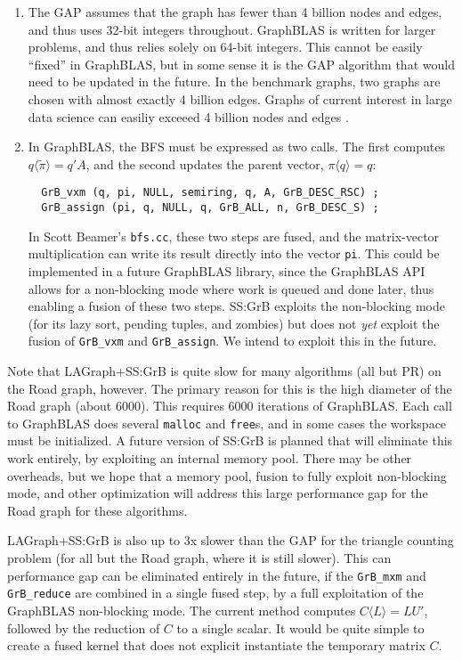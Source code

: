\begin{enumerate}
\item
The GAP assumes that the graph has fewer than 4 billion nodes and edges, and
thus uses 32-bit integers throughout.  GraphBLAS is written for larger
problems, and thus relies solely on 64-bit integers.  This cannot be easily
``fixed'' in GraphBLAS, but in some sense it is the GAP algorithm that would
need to be updated in the future.  In the benchmark graphs, two graphs are
chosen with almost exactly 4 billion edges.  Graphs of current interest in
large data science can easiliy exceeed 4 billion nodes and edges
\cite{9286235}.

\item In GraphBLAS, the BFS must be expressed as two calls.  The first computes
$q \langle \tilde \pi \rangle = q'A$, and the second updates the parent vector,
$ \pi \langle q \rangle = q$:

{\footnotesize
\begin{verbatim}
  GrB_vxm (q, pi, NULL, semiring, q, A, GrB_DESC_RSC) ;
  GrB_assign (pi, q, NULL, q, GrB_ALL, n, GrB_DESC_S) ; \end{verbatim}}

In Scott Beamer's \verb'bfs.cc', these two steps are fused, and the
matrix-vector multiplication can write its result directly into the vector
\verb'pi'.  This could be implemented in a future GraphBLAS library, since the
GraphBLAS API allows for a non-blocking mode where work is queued and done
later, thus enabling a fusion of these two steps.  SS:GrB exploits the
non-blocking mode (for its lazy sort, pending tuples, and zombies) but does not
{\em yet} exploit the fusion of \verb'GrB_vxm' and \verb'GrB_assign'.  We
intend to exploit this in the future.
\end{enumerate}

Note that LAGraph+SS:GrB is quite slow for many algorithms (all but PR) on the
Road graph, however.  The primary reason for this is the high diameter of the
Road graph (about 6000).  This requires 6000 iterations of GraphBLAS.  Each
call to GraphBLAS does several \verb'malloc' and \verb'free's, and in some
cases the workspace must be initialized.  A future version of SS:GrB is planned
that will eliminate this work entirely, by exploiting an internal memory pool.
There may be other overheads, but we hope that a memory pool, fusion to fully
exploit non-blocking mode, and other optimization will address this large
performance gap for the Road graph for these algorithms.

LAGraph+SS:GrB is also up to 3x slower than the GAP for the triangle counting
problem (for all but the Road graph, where it is still slower).  This can
performance gap can be eliminated entirely in the future, if the \verb'GrB_mxm'
and \verb'GrB_reduce' are combined in a single fused step, by a full
exploitation of the GraphBLAS non-blocking mode.  The current method computes
$C \langle L \rangle = LU'$, followed by the reduction of $C$ to a single
scalar.  It would be quite simple to create a fused kernel that does not
explicit instantiate the temporary matrix $C$.

